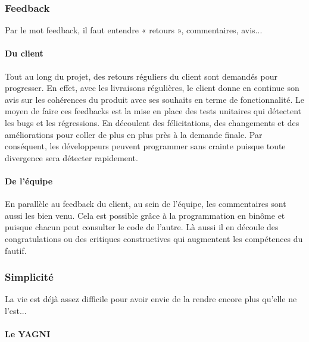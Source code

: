 \documentclass[]{article}
\let\oldparagraph\paragraph
\renewcommand{\paragraph}[1]{\oldparagraph{#1}\mbox{}}
\begin{document}
\hypertarget{feedback}{%
\subsubsection{Feedback}\label{feedback}}

Par le mot feedback, il faut entendre « retours », commentaires, avis...



\hypertarget{du-client}{%
\paragraph{Du client}\label{du-client}}

Tout au long du projet, des retours réguliers du client sont demandés
pour progresser. En effet, avec les livraisons régulières, le client
donne en continue son avis sur les cohérences du produit avec ses
souhaits en terme de fonctionnalité. Le moyen de faire ces feedbacks est
la mise en place des tests unitaires qui détectent les bugs et les
régressions. En découlent des félicitations, des changements et des
améliorations pour coller de plus en plus près à la demande finale. Par
conséquent, les développeurs peuvent programmer sans crainte puisque
toute divergence sera détecter rapidement.


\hypertarget{de-luxe9quipe}{%
\paragraph{De l'équipe}\label{de-luxe9quipe}}

En parallèle au feedback du client, au sein de l'équipe, les
commentaires sont aussi les bien venu. Cela est possible grâce à la
programmation en binôme et puisque chacun peut consulter le code de
l'autre. Là aussi il en découle des congratulations ou des critiques
constructives qui augmentent les compétences du fautif.


\hypertarget{simplicituxe9}{%
\subsubsection{Simplicité}\label{simplicituxe9}}

La vie est déjà assez difficile pour avoir envie de la rendre encore
plus qu'elle ne l'est...


\hypertarget{le-yagni}{%
\paragraph{Le YAGNI}\label{le-yagni}}
\end{document}
